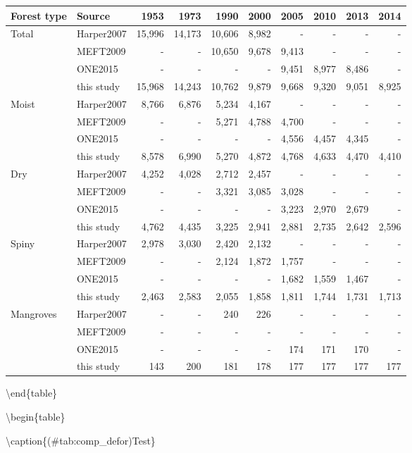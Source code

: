 \documentclass[]{article}
\theoremstyle{definition}
\theoremstyle{definition}
\theoremstyle{definition}
\theoremstyle{remark}
\begin{document}
\begin{tabular}[t]{llrrrrrrrr}
\toprule
Forest type & Source & 1953 & 1973 & 1990 & 2000 & 2005 & 2010 & 2013 & 2014\\
\midrule
Total & Harper2007 & 15,996 & 14,173 & 10,606 & 8,982 & - & - & - & -\\
 & MEFT2009 & - & - & 10,650 & 9,678 & 9,413 & - & - & -\\
 & ONE2015 & - & - & - & - & 9,451 & 8,977 & 8,486 & -\\
 & this study & 15,968 & 14,243 & 10,762 & 9,879 & 9,668 & 9,320 & 9,051 & 8,925\\
Moist & Harper2007 & 8,766 & 6,876 & 5,234 & 4,167 & - & - & - & -\\
\addlinespace
 & MEFT2009 & - & - & 5,271 & 4,788 & 4,700 & - & - & -\\
 & ONE2015 & - & - & - & - & 4,556 & 4,457 & 4,345 & -\\
 & this study & 8,578 & 6,990 & 5,270 & 4,872 & 4,768 & 4,633 & 4,470 & 4,410\\
Dry & Harper2007 & 4,252 & 4,028 & 2,712 & 2,457 & - & - & - & -\\
 & MEFT2009 & - & - & 3,321 & 3,085 & 3,028 & - & - & -\\
\addlinespace
 & ONE2015 & - & - & - & - & 3,223 & 2,970 & 2,679 & -\\
 & this study & 4,762 & 4,435 & 3,225 & 2,941 & 2,881 & 2,735 & 2,642 & 2,596\\
Spiny & Harper2007 & 2,978 & 3,030 & 2,420 & 2,132 & - & - & - & -\\
 & MEFT2009 & - & - & 2,124 & 1,872 & 1,757 & - & - & -\\
 & ONE2015 & - & - & - & - & 1,682 & 1,559 & 1,467 & -\\
\addlinespace
 & this study & 2,463 & 2,583 & 2,055 & 1,858 & 1,811 & 1,744 & 1,731 & 1,713\\
Mangroves & Harper2007 & - & - & 240 & 226 & - & - & - & -\\
 & MEFT2009 & - & - & - & - & - & - & - & -\\
 & ONE2015 & - & - & - & - & 174 & 171 & 170 & -\\
 & this study & 143 & 200 & 181 & 178 & 177 & 177 & 177 & 177\\
\bottomrule
\end{tabular}

\textbackslash{}end\{table\}

\textbackslash{}begin\{table\}

\textbackslash{}caption\{(\#tab:comp\_defor)Test\} \centering
\end{document}
